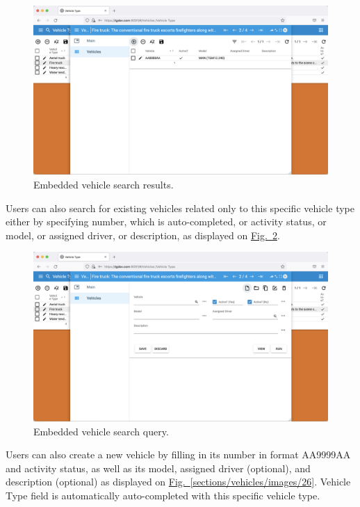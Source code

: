     \begin{figure}[!htbp]
	\centering
	\includegraphics[width=0.95\linewidth]{sections/vehicles/images/24.png}
	\caption{Embedded vehicle search results.}\label{sections/vehicles/images/24}
	\end{figure}

\newpage
Users can also search for existing vehicles related only to this specific vehicle type either by specifying number, which is auto-completed, or activity status, or model, or assigned driver, or description, as displayed on
\hyperref[sections/vehicles/images/25]{Fig.~\ref*{sections/vehicles/images/25}}.

    \begin{figure}[!htbp]
	\centering
	\includegraphics[width=0.95\linewidth]{sections/vehicles/images/25.png}
	\caption{Embedded vehicle search query.}\label{sections/vehicles/images/25}
	\end{figure}
	
\newpage
Users can also create a new vehicle by filling in its number in format AA9999AA and activity status, as well as its model, assigned driver (optional), and description (optional) as displayed on \hyperref[sections/vehicles/images/26]{Fig.~\ref*{sections/vehicles/images/26}}. Vehicle Type field is automatically auto-completed with this specific vehicle type.

